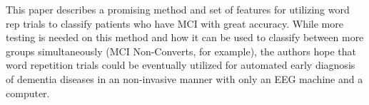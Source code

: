 \documentclass[Afour,times,sageh]{sagej}
\begin{document}
This paper describes a promising method and set of features for utilizing word rep trials to classify patients who have MCI with great accuracy. While more testing is needed on this method and how it can be used to classify between more groups simultaneously (MCI Non-Converts, for example), the authors hope that word repetition trials could be eventually utilized for automated early diagnosis of dementia diseases in an non-invasive manner with only an EEG machine and a computer.





\end{document}
